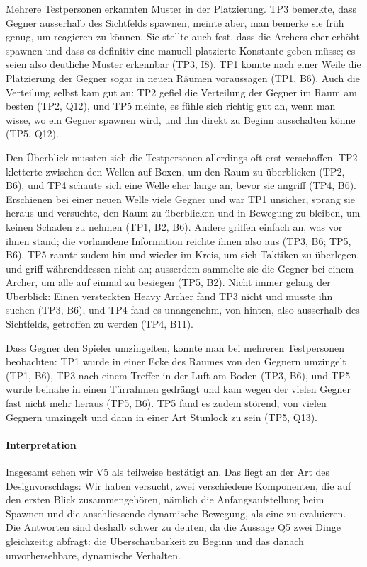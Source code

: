 \documentclass[../Main.tex]{subfiles}
\begin{document}
Mehrere Testpersonen erkannten Muster in der Platzierung. TP3 bemerkte, dass Gegner ausserhalb des Sichtfelds spawnen, meinte aber, man bemerke sie früh genug, um reagieren zu können. Sie stellte auch fest, dass die Archers eher erhöht spawnen und dass es definitiv eine manuell platzierte Konstante geben müsse; es seien also deutliche Muster erkennbar (TP3, I8). TP1 konnte nach einer Weile die Platzierung der Gegner sogar in neuen Räumen voraussagen (TP1, B6). Auch die Verteilung selbst kam gut an: TP2 gefiel die Verteilung der Gegner im Raum am besten (TP2, Q12), und TP5 meinte, es fühle sich richtig gut an, wenn man wisse, wo ein Gegner spawnen wird, und ihn direkt zu Beginn ausschalten könne (TP5, Q12).

Den Überblick mussten sich die Testpersonen allerdings oft erst verschaffen. TP2 kletterte zwischen den Wellen auf Boxen, um den Raum zu überblicken (TP2, B6), und TP4 schaute sich eine Welle eher lange an, bevor sie angriff (TP4, B6). Erschienen bei einer neuen Welle viele Gegner und war TP1 unsicher, sprang sie heraus und versuchte, den Raum zu überblicken und in Bewegung zu bleiben, um keinen Schaden zu nehmen (TP1, B2, B6). Andere griffen einfach an, was vor ihnen stand; die vorhandene Information reichte ihnen also aus (TP3, B6; TP5, B6). TP5 rannte zudem hin und wieder im Kreis, um sich Taktiken zu überlegen, und griff währenddessen nicht an; ausserdem sammelte sie die Gegner bei einem Archer, um alle auf einmal zu besiegen (TP5, B2). Nicht immer gelang der Überblick: Einen versteckten Heavy Archer fand TP3 nicht und musste ihn suchen (TP3, B6), und TP4 fand es unangenehm, von hinten, also ausserhalb des Sichtfelds, getroffen zu werden (TP4, B11).

Dass Gegner den Spieler umzingelten, konnte man bei mehreren Testpersonen beobachten: TP1 wurde in einer Ecke des Raumes von den Gegnern umzingelt (TP1, B6), TP3 nach einem Treffer in der Luft am Boden (TP3, B6), und TP5 wurde beinahe in einen Türrahmen gedrängt und kam wegen der vielen Gegner fast nicht mehr heraus (TP5, B6). TP5 fand es zudem störend, von vielen Gegnern umzingelt und dann in einer Art Stunlock zu sein (TP5, Q13).

\paragraph{Interpretation}
Insgesamt sehen wir V5 als teilweise bestätigt an. Das liegt an der Art des Designvorschlags: Wir haben versucht, zwei verschiedene Komponenten, die auf den ersten Blick zusammengehören, nämlich die Anfangsaufstellung beim Spawnen und die anschliessende dynamische Bewegung, als eine zu evaluieren. Die Antworten sind deshalb schwer zu deuten, da die Aussage Q5 zwei Dinge gleichzeitig abfragt: die Überschaubarkeit zu Beginn und das danach unvorhersehbare, dynamische Verhalten.
\end{document}
